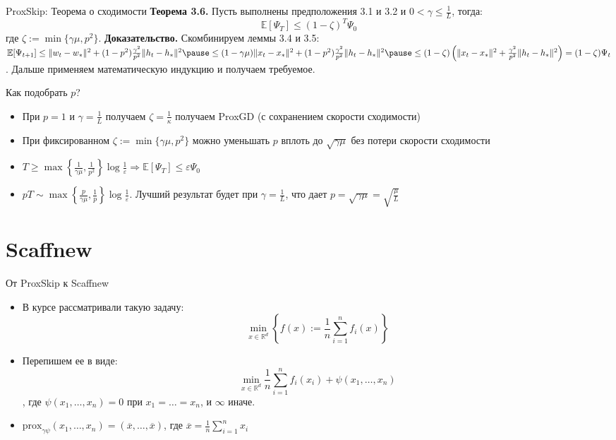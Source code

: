 \documentclass[russian,xcolor=dvipsnames]{beamer}
\begin{document}
\begin{frame}{ProxSkip: Теорема о сходимости}
\textbf{Теорема 3.6.} Пусть выполнены предположения 3.1 и 3.2 и $0 < \gamma \le \frac1L$, тогда:
$$ \mathbb{E}[\Psi_T] \le (1 - \zeta)^T \Psi_0$$
где $\zeta := \min\{\gamma \mu, p^2 \}$.
\newline
\textbf{Доказательство.} Скомбинируем леммы 3.4 и 3.5:
$ \mathbb{E}[\Psi_{t+1}] \le \| w_t - w_* \|^2 + (1 - p^2) \frac{\gamma^2}{p^2} \| h_t - h_* \|^2 \pause
\le \newline  (1 - \gamma \mu) \| x_t - x_* \|^2 + (1 - p^2) \frac{\gamma^2}{p^2} \| h_t - h_* \|^2 
\pause \le \newline (1 - \zeta) \left( \| x_t - x_* \|^2 + \frac{\gamma^2}{p^2} \| h_t - h_* \|^2 \right) = (1 - \zeta) \Psi_t$. \newline
Дальше применяем математическую индукцию и получаем требуемое.
\end{frame}

\begin{frame}{Как подобрать $p$?}
\begin{itemize}
    \item При $p=1$ и $\gamma = \frac1L$ получаем $\zeta = \frac{1}{\kappa}$ получаем ProxGD (с сохранением скорости сходимости)
    \pause
    \item При фиксированном $\zeta := \min\{ \gamma\mu,  p^2\}$ можно уменьшать $p$ вплоть до ${\sqrt{\gamma \mu}}$ без потери скорости сходимости
    \pause
    \item $T \ge \max\left\{ \frac{1}{\gamma \mu}, \frac{1}{p^2}\right\} \log \frac{1}{\varepsilon} \Longrightarrow \mathbb{E}[\Psi_T] \le \varepsilon \Psi_0$
    \pause
    \item $pT \sim \max\left\{ \frac{p}{\gamma \mu}, \frac{1}{p}\right\} \log \frac{1}{\varepsilon}$. Лучший результат будет при $\gamma = \frac1L$, что дает $p = {\sqrt{\gamma \mu}} = \sqrt{
    \frac{\mu}{L}} $
\end{itemize}
\end{frame}


\section{Scaffnew}

\begin{frame}{От ProxSkip к Scaffnew}
\begin{itemize}
    \item В курсе рассматривали такую задачу: 
    $$ \min_{x \in \mathbb{R}^d} \left\{ f(x) := \frac1n \sum\limits_{i=1}^n f_i(x) \right\}$$
    \pause
    \item Перепишем ее в виде: $$\min_{x \in \mathbb{R}^d} \frac1n \sum\limits_{i=1}^n f_i(x_i) + \psi(x_1, \dots, x_n) $$, где $\psi(x_1, \dots, x_n) = 0$ при $x_1 = \dots = x_n$, и $\infty$ иначе.
    \pause
    \item $\text{prox}_{\gamma \psi}(x_1, \dots, x_n) = (\overline x, \dots, \overline x)$, где $\overline x = \frac1n \sum\limits_{i=1}^{n} x_i$
    
\end{itemize}
\end{frame}
\end{document}
